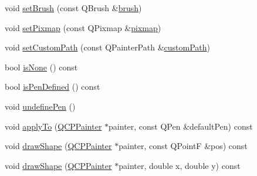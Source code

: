 \begin{DoxyCompactItemize}
\item 
void \mbox{\hyperlink{class_q_c_p_scatter_style_a74d692aaeb8d4b36d6f7d510e44264b1}{set\+Brush}} (const Q\+Brush \&\mbox{\hyperlink{class_q_c_p_scatter_style_adc4f66aed84f1d7a3a5aabf4f48f31a6}{brush}})
\item 
void \mbox{\hyperlink{class_q_c_p_scatter_style_a5fb611d46acfac520d7b89a1c71d9246}{set\+Pixmap}} (const Q\+Pixmap \&\mbox{\hyperlink{class_q_c_p_scatter_style_a9b2d1a2ec0aac0c74f7582d14050e93a}{pixmap}})
\item 
void \mbox{\hyperlink{class_q_c_p_scatter_style_a96a3e949f90b2afe5677ca9412a12a1e}{set\+Custom\+Path}} (const Q\+Painter\+Path \&\mbox{\hyperlink{class_q_c_p_scatter_style_aef1fac84c9830fd97f2a8568e605e372}{custom\+Path}})
\item 
bool \mbox{\hyperlink{class_q_c_p_scatter_style_a72db6bcb1e1abd6e53c1315dd3dea7e4}{is\+None}} () const
\item 
bool \mbox{\hyperlink{class_q_c_p_scatter_style_a47077eb6450fe9a788f833e4ec1b1d5a}{is\+Pen\+Defined}} () const
\item 
void \mbox{\hyperlink{class_q_c_p_scatter_style_acabc2a8c83d650b946f50c3166b6c35e}{undefine\+Pen}} ()
\item 
void \mbox{\hyperlink{class_q_c_p_scatter_style_afd8044ece445300499ca0dc164821e0f}{apply\+To}} (\mbox{\hyperlink{class_q_c_p_painter}{Q\+C\+P\+Painter}} $\ast$painter, const Q\+Pen \&default\+Pen) const
\item 
void \mbox{\hyperlink{class_q_c_p_scatter_style_a89b5105e6027bfcbfeefed9d201b607c}{draw\+Shape}} (\mbox{\hyperlink{class_q_c_p_painter}{Q\+C\+P\+Painter}} $\ast$painter, const Q\+PointF \&pos) const
\item 
void \mbox{\hyperlink{class_q_c_p_scatter_style_a95c297b114c77c22428ef40f54620ddf}{draw\+Shape}} (\mbox{\hyperlink{class_q_c_p_painter}{Q\+C\+P\+Painter}} $\ast$painter, double x, double y) const
\end{DoxyCompactItemize}
